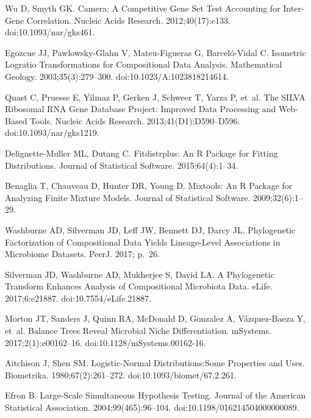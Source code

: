 \documentclass[10pt,letterpaper]{article}
\begin{document}
\begin{thebibliography}{10}
Wu D, Smyth GK.
\newblock Camera: A Competitive Gene Set Test Accounting for Inter-Gene
  Correlation.
\newblock Nucleic Acids Research. 2012;40(17):e133.
\newblock doi:{10.1093/nar/gks461}.

Egozcue JJ, {Pawlowsky-Glahn} V, {Mateu-Figueras} G, {Barcel{\'o}-Vidal} C.
\newblock Isometric {{Logratio Transformations}} for {{Compositional Data
  Analysis}}.
\newblock Mathematical Geology. 2003;35(3):279--300.
\newblock doi:{10.1023/A:1023818214614}.

Quast C, Pruesse E, Yilmaz P, Gerken J, Schweer T, Yarza P, et~al.
\newblock The {{SILVA}} Ribosomal {{RNA}} Gene Database Project: Improved Data
  Processing and Web-Based Tools.
\newblock Nucleic Acids Research. 2013;41(D1):D590--D596.
\newblock doi:{10.1093/nar/gks1219}.

{Delignette-Muller} ML, Dutang C.
\newblock Fitdistrplus: {{An R}} Package for Fitting Distributions.
\newblock Journal of Statistical Software. 2015;64(4):1--34.

Benaglia T, Chauveau D, Hunter DR, Young D.
\newblock Mixtools: {{An R}} Package for Analyzing Finite Mixture Models.
\newblock Journal of Statistical Software. 2009;32(6):1--29.

Washburne AD, Silverman JD, Leff JW, Bennett DJ, Darcy JL.
\newblock Phylogenetic Factorization of Compositional Data Yields Lineage-Level
  Associations in Microbiome Datasets.
\newblock PeerJ. 2017; p.~26.

Silverman JD, Washburne AD, Mukherjee S, David LA.
\newblock A Phylogenetic Transform Enhances Analysis of Compositional
  Microbiota Data.
\newblock eLife. 2017;6:e21887.
\newblock doi:{10.7554/eLife.21887}.

Morton JT, Sanders J, Quinn RA, McDonald D, Gonzalez A, {V{\'a}zquez-Baeza} Y,
  et~al.
\newblock Balance {{Trees Reveal Microbial Niche Differentiation}}.
\newblock mSystems. 2017;2(1):e00162--16.
\newblock doi:{10.1128/mSystems.00162-16}.

Aitchison J, Shen SM.
\newblock Logistic-Normal Distributions:{{Some}} Properties and Uses.
\newblock Biometrika. 1980;67(2):261--272.
\newblock doi:{10.1093/biomet/67.2.261}.

Efron B.
\newblock Large-{{Scale Simultaneous Hypothesis Testing}}.
\newblock Journal of the American Statistical Association.
  2004;99(465):96--104.
\newblock doi:{10.1198/016214504000000089}.


\end{thebibliography}
\end{document}
